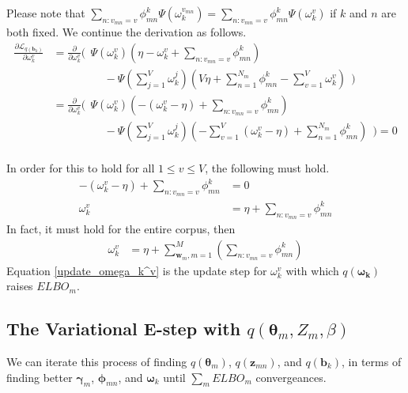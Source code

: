 \documentclass[a4]{article}
\begin{document}
Please note that
$\sum_{n:v_{mn}=v} \phi_{mn}^{k}\Psi( \omega_{k}^{v_{mn}} ) = 
 \sum_{n:v_{mn}=v} \phi_{mn}^{k}\Psi( \omega_{k}^{v} )$
if $k$ and $n$ are both fixed. We continue the derivation as follows.
\begin{equation}
\begin{aligned}
    \frac{\partial\mathcal{L}_{q(\mathbf{b}_{k})}}
         {\partial \omega_k^v}
&=
    \frac{\partial}{\partial\omega_k^v} 
    \Big(\:\:
        \Psi( \omega_{k}^v )
        \left(
            \eta - \omega_k^v +\sum_{n:v_{mn}=v} \phi_{mn}^{k}
        \right)\\
&\:\:\:\:\:\:\:\:\:\:\:\:\:\:\:\:\:\:\:\:\:-
        \Psi( \sum_{j=1}^{V} \omega_{k}^j )
        \left(
            V\eta  + 
            \sum_{n=1}^{N_m} \phi_{mn}^{k} -
            \sum_{v=1}^{V} \omega_k^v
        \right)\:\:\Big)\\
&=
    \frac{\partial}{\partial\omega_k^v}
    \Big(\:\:
        \Psi( \omega_{k}^v )
        \left(
            - ( \omega_k^v - \eta ) +\sum_{n:v_{mn}=v} \phi_{mn}^{k}
        \right)\\
&\:\:\:\:\:\:\:\:\:\:\:\:\:\:\:\:\:\:\:\:\:-
        \Psi( \sum_{j=1}^{V} \omega_{k}^j )
        \left(
            - \sum_{v=1}^{V} ( \omega_k^v - \eta )
            + \sum_{n=1}^{N_m} \phi_{mn}^{k}
        \right)\:\:\Big) = 0\\
\end{aligned}
\end{equation}

In order for this to hold for all $1 \le v \le V$, the following must hold.
\begin{equation}
\begin{aligned}
  - ( \omega_k^v - \eta ) +\sum_{n:v_{mn}=v} \phi_{mn}^{k} &= 0\\
  \omega_k^v &= \eta  +\sum_{n:v_{mn}=v} \phi_{mn}^{k}
\end{aligned}
\end{equation}
In fact, it must hold for the entire corpus, then
\begin{equation}
\begin{aligned}
  \omega_k^v &= \eta + \sum_{\mathbf{w}_m, m=1}^M 
  \left(
      \sum_{n:v_{mn}=v} \phi_{mn}^{k}
  \right)\label{update_omega_k^v}
\end{aligned}
\end{equation}
Equation \ref{update_omega_k^v} is the update step for $\omega_k^v$ with which $q(\bm{\omega_k})$ raises $ELBO_m$.


\subsection{The Variational E-step with  $q(\bm{\theta}_m , Z_{m}, \beta )$}
We can iterate this process of finding $q(\bm{\theta}_m)$,
$q(\mathbf{z}_{mn})$, and $q(\mathbf{b}_k)$, in terms of finding
better $\bm{\gamma}_m$, $\bm{\phi}_{mn}$, and $\bm{\omega}_k$ until $\sum_m ELBO_m$ convergeances.
\end{document}
